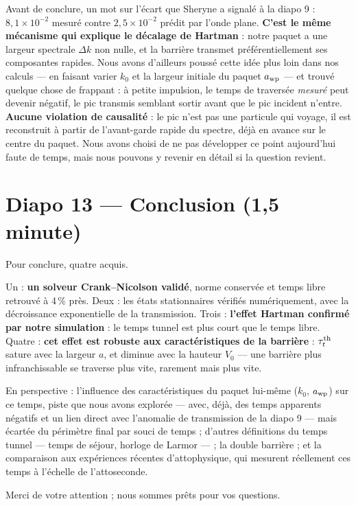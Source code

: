 \documentclass[11pt,a4paper]{article}
\newcommand{\diapo}[2]{\section*{Diapo #1 --- #2}}
\begin{document}
	
	Avant de conclure, un mot sur l'écart que Sheryne a signalé à la diapo 9 :
	$8{,}1\times10^{-2}$ mesuré contre $2{,}5\times10^{-2}$ prédit par l'onde
	plane. \textbf{C'est le même mécanisme qui explique le décalage de Hartman} :
	notre paquet a une largeur spectrale $\Delta k$ non nulle, et la barrière
	transmet préférentiellement ses composantes rapides. Nous avons d'ailleurs
	poussé cette idée plus loin dans nos calculs --- en faisant varier $k_0$ et
	la largeur initiale du paquet $a_{\rm wp}$ --- et trouvé quelque chose de
	frappant : à petite impulsion, le temps de traversée \emph{mesuré} peut
	devenir négatif, le pic transmis semblant sortir avant que le pic incident
	n'entre. \textbf{Aucune violation de causalité} : le pic n'est pas une
	particule qui voyage, il est reconstruit à partir de l'avant-garde rapide du
	spectre, déjà en avance sur le centre du paquet. Nous avons choisi de ne pas
	développer ce point aujourd'hui faute de temps, mais nous pouvons y revenir
	en détail si la question revient.
	
	\diapo{13}{Conclusion (1,5 minute)}
	
	Pour conclure, quatre acquis.
	
	Un : \textbf{un solveur Crank--Nicolson validé}, norme conservée et temps libre
	retrouvé à 4\,\% près. Deux : les états stationnaires vérifiés numériquement,
	avec la décroissance exponentielle de la transmission. Trois :
	\textbf{l'effet Hartman confirmé par notre simulation} : le temps tunnel est plus
	court que le temps libre. Quatre : \textbf{cet effet est robuste aux
		caractéristiques de la barrière} : $\tau_t^{\rm th}$ sature avec la largeur
	$a$, et diminue avec la hauteur $V_0$ --- une barrière plus infranchissable se
	traverse plus vite, rarement mais plus vite.
	
	En perspective : l'influence des caractéristiques du paquet lui-même ($k_0$,
	$a_{\rm wp}$) sur ce temps, piste que nous avons explorée --- avec, déjà, des
	temps apparents négatifs et un lien direct avec l'anomalie de transmission de
	la diapo 9 --- mais écartée du périmètre final par souci de temps ; d'autres
	définitions du temps tunnel --- temps de séjour, horloge de Larmor --- ; la
	double barrière ; et la comparaison aux expériences récentes d'attophysique,
	qui mesurent réellement ces temps à l'échelle de l'attoseconde.
	
	Merci de votre attention ; nous sommes prêts pour vos questions.
	
\end{document}
